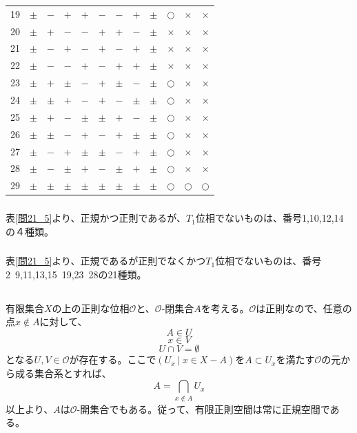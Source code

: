 \documentclass{jsarticle}
\begin{document}
\begin{table}[htb]
\begin{tabular}{|c||c|c|c|c|c|c|c|c||c|c|c|}
	19&$\pm$&$-$&$+$&$+$&$-$&$-$&$+$&$\pm$&$\bigcirc$&$\times$&$\times$\\
	20&$\pm$&$+$&$-$&$-$&$+$&$+$&$-$&$\pm$&$\times$&$\times$&$\times$\\
	21&$\pm$&$-$&$+$&$-$&$+$&$-$&$+$&$\pm$&$\times$&$\times$&$\times$\\
	22&$\pm$&$-$&$-$&$+$&$-$&$+$&$+$&$\pm$&$\times$&$\times$&$\times$\\
	23&$\pm$&$+$&$\pm$&$-$&$+$&$\pm$&$-$&$\pm$&$\bigcirc$&$\times$&$\times$\\
	24&$\pm$&$\pm$&$+$&$-$&$+$&$-$&$\pm$&$\pm$&$\bigcirc$&$\times$&$\times$\\
	25&$\pm$&$+$&$-$&$\pm$&$\pm$&$+$&$-$&$\pm$&$\bigcirc$&$\times$&$\times$\\
	26&$\pm$&$\pm$&$-$&$+$&$-$&$+$&$\pm$&$\pm$&$\bigcirc$&$\times$&$\times$\\
	27&$\pm$&$-$&$+$&$\pm$&$\pm$&$-$&$+$&$\pm$&$\bigcirc$&$\times$&$\times$\\
	28&$\pm$&$-$&$\pm$&$+$&$-$&$\pm$&$+$&$\pm$&$\bigcirc$&$\times$&$\times$\\
	29&$\pm$&$\pm$&$\pm$&$\pm$&$\pm$&$\pm$&$\pm$&$\pm$&$\bigcirc$&$\bigcirc$&$\bigcirc$\\ \hline
  \end{tabular}
\end{table}
\subsubsection{}
表\ref{問21_5}より、正規かつ正則であるが、$T_1$位相でないものは、番号1,10,12,14の４種類。
\subsubsection{}
表\ref{問21_5}より、正規であるが正則でなくかつ$T_1$位相でないものは、番号2~9,11,13,15~19,23~28の21種類。



\subsection{}
有限集合$X$の上の正則な位相$\mathcal{O}$と、$\mathcal{O}$-閉集合$A$を考える。$\mathcal{O}$は正則なので、任意の点$x\notin A$に対して、
\[A\in U\]
\[x\in V\]
\[U\cap V=\emptyset\]
となる$U,V\in\mathcal{O}$が存在する。ここで$(U_x\ |\ x\in X-A)$を$A\subset U_x$を満たす$\mathcal{O}$の元から成る集合系とすれば、
\[A=\bigcap_{x\notin A}U_x\]
以上より、$A$は$\mathcal{O}$-開集合でもある。従って、有限正則空間は常に正規空間である。
\end{document}
